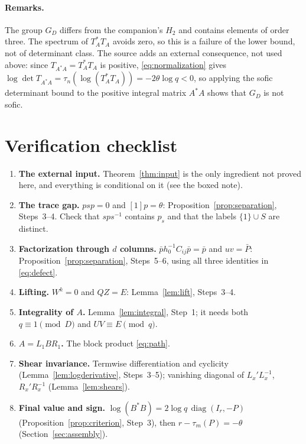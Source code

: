 \documentclass[11pt]{article}
\theoremstyle{remark}
\numberwithin{equation}{section}
\newcommand{\diag}{\operatorname{diag}}
\begin{document}
\paragraph{Remarks.}
The group $G_D$ differs from the companion's $H_2$ and contains elements of order three. The spectrum of $T_A^*T_A$ avoids zero, so this is a failure of the lower bound, not of determinant class. The source adds an external consequence, not used above: since $T_{A^*A}=T_A^*T_A$ is positive, \eqref{eq:normalization} gives $\log\det T_{A^*A}=\tau_n(\log(T_A^*T_A))=-2\theta\log q<0$, so applying the sofic determinant bound \cite[Theorem 5]{ElekSzabo2005} to the positive integral matrix $A^*A$ shows that $G_D$ is not sofic.

\section{Verification checklist}
\label{sec:checklist}

\begin{enumerate}[label=\arabic*.,itemsep=2pt,topsep=3pt]
\item \textbf{The external input.} Theorem~\ref{thm:input} is the only ingredient not proved here, and everything is conditional on it (see the boxed note).
\item \textbf{The trace gap.} $psp=0$ and $[1]p=\theta$: Proposition~\ref{prop:separation}, Steps~3--4. Check that $sps^{-1}$ contains $p_s$ and that the labels $\{1\}\cup S$ are distinct.
\item \textbf{Factorization through $d$ columns.} $\bar ph_0^{-1}C_{ij}\bar p=\bar p$ and $uv=\bar P$: Proposition~\ref{prop:separation}, Steps~5--6, using all three identities in \eqref{eq:defect}.
\item \textbf{Lifting.} $W^k=0$ and $QZ=E$: Lemma~\ref{lem:lift}, Steps~3--4.
\item \textbf{Integrality of $A$.} Lemma~\ref{lem:integral}, Step~1; it needs both $q\equiv1\pmod D$ and $UV\equiv E\pmod q$.
\item \textbf{$A=L_1BR_1$.} The block product \eqref{eq:path}.
\item \textbf{Shear invariance.} Termwise differentiation and cyclicity (Lemma~\ref{lem:logderivative}, Steps~3--5); vanishing diagonal of $L_x'L_x^{-1}$, $R_x'R_x^{-1}$ (Lemma~\ref{lem:shears}).
\item \textbf{Final value and sign.} $\log(B^*B)=2\log q\,\diag(I_r,-P)$ (Proposition~\ref{prop:criterion}, Step~3), then $r-\tau_m(P)=-\theta$ (Section~\ref{sec:assembly}).
\end{enumerate}

\begingroup
\raggedright


\endgroup
\end{document}
